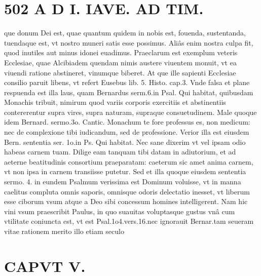 \documentclass{article}
\begin{document}
\begin{pages}
\section*{502 A D I. IAVE. AD TIM. }\pstart que donum Dei est, quae quantum quidem in nobis est, fouenda, sustentanda, tuendaque est, vt nostro muneri satis esse possimus. Aliâs enim nostra culpa fit, quod inutiles aut minus idonei euadimus. Praeclarum est exemplum veteris Ecclesiae, quae Alcibiadem quendam nimis austere viuentem monuit, vt ea viuendi ratione abstineret, vinumque biberet. At que ille sapienti Ecclesiae consilio paruit libens, vt refert Eusebus lib. 5. Histo. cap.3. Vnde falsa et plane respuenda est illa laus, quam Bernardus serm.6.in Psal. Qui habitat, quibusdam Monachis tribuit, nimirum quod variis corporis exercitiis et abstinentiis contererentur supra vires, supra naturam, supraque consuetudinem. Male quoque idem Bernard. sermo.3o. Cantic. Monachum te fore professus es, non medicum: nec de complexione tibi iudicandum, sed de professione. Verior illa est eiusdem Bern. sententia ser. 1o.in Ps. Qui habitat. Nec sane dixerim vt vel ipsam odio habeas carnem tuam. Dilige eam tanquam tibi datam in adiutorium, et ad aeterne beatitudinis consortium praeparatam: caeterum sic amet anima carnem, vt non ipsa in carnem transiisse putetur. Sed et illa quoque eiusdem sententia sermo. 4. in eundem Psalmum verissima est Dominum voluisse, vt in manna caelitus compluta omnis saporis, omnisque odoris delectatio inesset, vt liberum esse ciborum vsum atque a Deo sibi concessum homines intelligerent. Nam hic vini vsum praescribit Paulus, in quo suauitas voluptasque gustus vnâ cum vtilitate coniuncta est, vt est Psal.1o4.vers.16.nec ignorauit Bernar.tam seueram vitae rationem merito illo etiam seculo  \pend
\section*{CAPVT V. }
\marginpar{[ p.383 ]}\pstart {}
{}

\end{pages}
\end{document}

